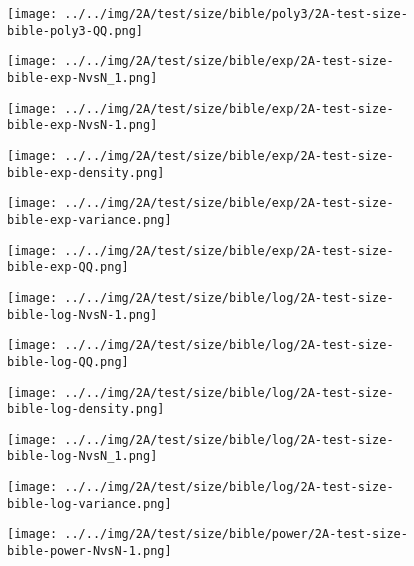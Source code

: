\begin{figure}[H]
\centering	\texttt{[image: ../../img/2A/test/size/bible/poly3/2A-test-size-bible-poly3-QQ.png]}
\end{figure}
\begin{figure}[H]
\centering	\texttt{[image: ../../img/2A/test/size/bible/exp/2A-test-size-bible-exp-NvsN\_1.png]}
\end{figure}
\begin{figure}[H]
\centering	\texttt{[image: ../../img/2A/test/size/bible/exp/2A-test-size-bible-exp-NvsN-1.png]}
\end{figure}
\begin{figure}[H]
\centering	\texttt{[image: ../../img/2A/test/size/bible/exp/2A-test-size-bible-exp-density.png]}
\end{figure}
\begin{figure}[H]
\centering	\texttt{[image: ../../img/2A/test/size/bible/exp/2A-test-size-bible-exp-variance.png]}
\end{figure}
\begin{figure}[H]
\centering	\texttt{[image: ../../img/2A/test/size/bible/exp/2A-test-size-bible-exp-QQ.png]}
\end{figure}
\begin{figure}[H]
\centering	\texttt{[image: ../../img/2A/test/size/bible/log/2A-test-size-bible-log-NvsN-1.png]}
\end{figure}
\begin{figure}[H]
\centering	\texttt{[image: ../../img/2A/test/size/bible/log/2A-test-size-bible-log-QQ.png]}
\end{figure}
\begin{figure}[H]
\centering	\texttt{[image: ../../img/2A/test/size/bible/log/2A-test-size-bible-log-density.png]}
\end{figure}
\begin{figure}[H]
\centering	\texttt{[image: ../../img/2A/test/size/bible/log/2A-test-size-bible-log-NvsN\_1.png]}
\end{figure}
\begin{figure}[H]
\centering	\texttt{[image: ../../img/2A/test/size/bible/log/2A-test-size-bible-log-variance.png]}
\end{figure}
\begin{figure}[H]
\centering	\texttt{[image: ../../img/2A/test/size/bible/power/2A-test-size-bible-power-NvsN-1.png]}
\end{figure}
